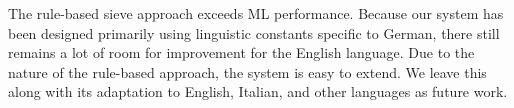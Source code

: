 \documentclass[25pt, a0paper, portrait, margin=10mm, innermargin=15mm,
blockverticalspace=15mm, colspace=15mm, subcolspace=8mm]{tikzposter}
\begin{document}
\begin{columns}
	{
The rule-based sieve approach exceeds ML performance. Because our system has been designed primarily using linguistic constants specific to German, there still remains a lot of room for improvement for the English language. Due to the nature of the rule-based approach, the system is easy to extend. We leave this along with its adaptation to English, Italian, and other languages as future work.
	}
\end{columns}
\end{document}
